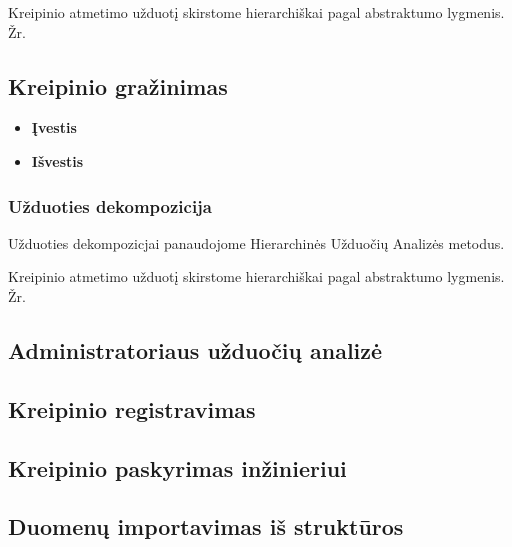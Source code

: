	
	Kreipinio atmetimo užduotį skirstome hierarchiškai pagal abstraktumo lygmenis. Žr. 
	
	\subsection {Kreipinio gražinimas}	
	
		\begin{itemize}
			\item \textbf{Įvestis}
			\item \textbf{Išvestis} 
		\end{itemize}

	\subsubsection {Užduoties dekompozicija}

	Užduoties dekompozicjai panaudojome Hierarchinės Užduočių Analizės metodus.
 		

	Kreipinio atmetimo užduotį skirstome hierarchiškai pagal abstraktumo lygmenis. Žr. 

\subsection {Administratoriaus užduočių analizė}

	\subsection {Kreipinio registravimas}

	\subsection {Kreipinio paskyrimas inžinieriui}

	\subsection {Duomenų importavimas iš struktūros}

